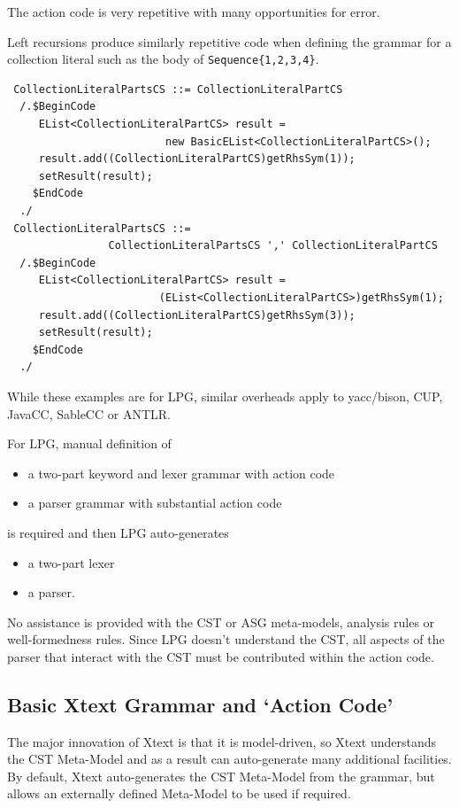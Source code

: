 \documentclass[runningheads,a4paper]{llncs}
\begin{document}
The action code is very repetitive with many opportunities for error.

Left recursions produce similarly repetitive code when defining the grammar for a collection literal such as the body of \verb+Sequence{1,2,3,4}+.

{\small\begin{verbatim}
 CollectionLiteralPartsCS ::= CollectionLiteralPartCS
  /.$BeginCode
     EList<CollectionLiteralPartCS> result =
                         new BasicEList<CollectionLiteralPartCS>();
     result.add((CollectionLiteralPartCS)getRhsSym(1));
     setResult(result);
    $EndCode
  ./
 CollectionLiteralPartsCS ::=
                CollectionLiteralPartsCS ',' CollectionLiteralPartCS
  /.$BeginCode
     EList<CollectionLiteralPartCS> result =
                        (EList<CollectionLiteralPartCS>)getRhsSym(1);
     result.add((CollectionLiteralPartCS)getRhsSym(3));
     setResult(result);
    $EndCode
  ./
\end{verbatim}}

While these examples are for LPG, similar overheads apply to yacc/bison, CUP, JavaCC, SableCC or ANTLR.

For LPG, manual definition of
\begin{itemize}
\item a two-part keyword and lexer grammar with action code
\item a parser grammar with substantial action code
\end{itemize}
is required and then LPG auto-generates
\begin{itemize}
\item a two-part lexer 
\item a parser.
\end{itemize}
No assistance is provided with the CST or ASG meta-models, analysis rules or well-formedness rules. Since LPG doesn't understand the CST, all aspects of the parser that interact with the CST must be contributed within the action code.

\subsection{Basic Xtext Grammar and `Action Code'}

The major innovation of Xtext is that it is model-driven, so Xtext understands the CST Meta-Model and as a result can auto-generate many additional facilities. By default, Xtext auto-generates the CST Meta-Model from the grammar, but allows an externally defined Meta-Model to be used if required.
\end{document}
